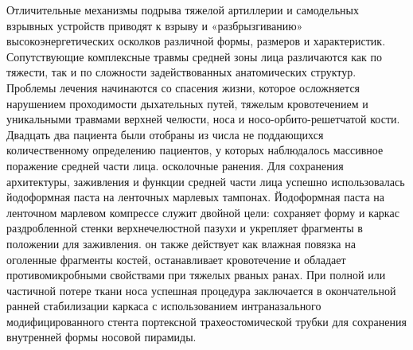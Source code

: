 Отличительные механизмы подрыва тяжелой артиллерии и самодельных взрывных
устройств приводят к взрыву и «разбрызгиванию» высокоэнергетических осколков
различной формы, размеров и характеристик. Сопутствующие комплексные травмы
средней зоны лица различаются как по тяжести, так и по сложности задействованных
анатомических структур. Проблемы лечения начинаются со спасения жизни, которое
осложняется нарушением проходимости дыхательных путей, тяжелым кровотечением и
уникальными травмами верхней челюсти, носа и носо-орбито-решетчатой кости.
Двадцать два пациента были отобраны из числа не поддающихся количественному
определению пациентов, у которых наблюдалось массивное поражение средней части
лица. осколочные ранения. Для сохранения архитектуры, заживления и функции
средней части лица успешно использовалась йодоформная паста на ленточных
марлевых тампонах. Йодоформная паста на ленточном марлевом компрессе служит
двойной цели: сохраняет форму и каркас раздробленной стенки верхнечелюстной
пазухи и укрепляет фрагменты в положении для заживления. он также действует как
влажная повязка на оголенные фрагменты костей, останавливает кровотечение и
обладает противомикробными свойствами при тяжелых рваных ранах. При полной или
частичной потере ткани носа успешная процедура заключается в окончательной
ранней стабилизации каркаса с использованием интраназального модифицированного
стента портексной трахеостомической трубки для сохранения внутренней формы
носовой пирамиды.\cite{shuker2016}

